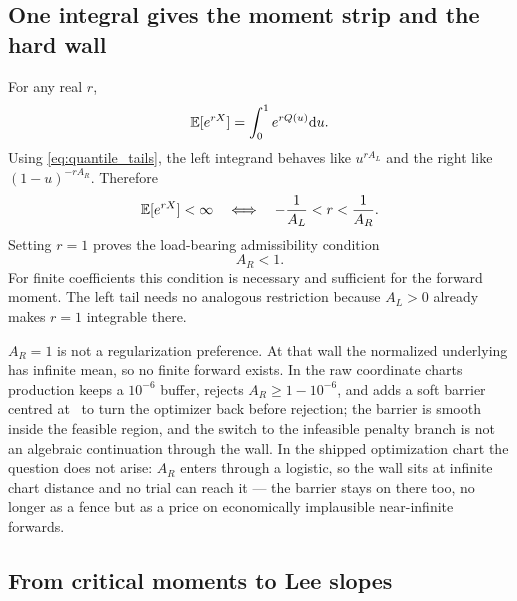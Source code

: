 \documentclass[11pt]{article}
\begin{document}
\subsection{One integral gives the moment strip and the hard wall}

For any real $r$,
\[
\mathbb{E}[e^{rX}]=\int_0^1e^{rQ(u)}\mathrm{d} u.
\]
Using \eqref{eq:quantile_tails}, the left integrand behaves like $u^{rA_L}$
and the right like $(1-u)^{-rA_R}$.  Therefore
\begin{equation}
\mathbb{E}[e^{rX}]<\infty
\quad\Longleftrightarrow\quad
-\frac{1}{A_L}<r<\frac{1}{A_R}.
\label{eq:moment_strip}
\end{equation}
Setting $r=1$ proves the load-bearing admissibility condition
\begin{equation}
A_R<1.
\label{eq:finite_forward}
\end{equation}
For finite coefficients this condition is necessary and sufficient for the
forward moment.  The left tail needs no analogous restriction because
$A_L>0$ already makes $r=1$ integrable there.

\begin{caution}
$A_R=1$ is not a regularization preference.  At that wall the normalized
underlying has infinite mean, so no finite forward exists.  In the raw
coordinate charts production keeps a $10^{-6}$ buffer, rejects
$A_R\ge1-10^{-6}$, and adds a soft barrier centred at
\lqdbarriercenter\ to turn the optimizer back before rejection; the barrier
is smooth inside the feasible region, and the switch to the infeasible
penalty branch is not an algebraic continuation through the wall.  In the
shipped optimization chart the question does not arise: $A_R$ enters
through a logistic, so the wall sits at infinite chart distance and no
trial can reach it --- the barrier stays on there too, no longer as a
fence but as a price on economically implausible near-infinite forwards.
\end{caution}

\subsection{From critical moments to Lee slopes}
\end{document}
